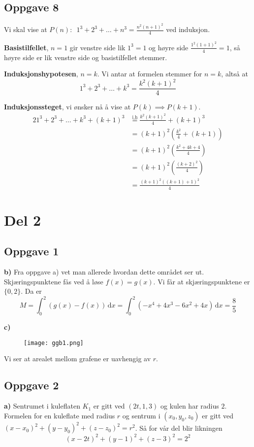 \subsection{Oppgave 8}
Vi skal vise at $P(n): \enspace1^3+2^3+\dots+n^3=\frac{n^2(n+1)^2}{4}$ ved induksjon. \newline

\textbf{Basistilfellet}, $n=1$ gir venstre side lik $1^3=1$ og høyre side $\frac{1^2(1+1)^2}{4}=1$, så høyre side er lik venstre side og basistilfellet stemmer. \newline

\textbf{Induksjonshypotesen}, $n=k$. Vi antar at formelen stemmer for $n=k$, altså at $$1^3+2^3+\dots+k^3 = \frac{k^2(k+1)^2}{4}$$ 

\textbf{Induksjonssteget}, vi ønsker nå å vise at $P(k)\implies P(k+1)$. 
\begin{alignat*}{2}
	1^3+2^3+\dots+k^3+(k+1)^3 &\overset{\text{i.h}}{=} \frac{k^2(k+1)^2}{4} + (k+1)^3 \\
	&= (k+1)^2\left(\frac{k^2}{4} + (k+1)\right) \\
	&= (k+1)^2 \left(\frac{k^2+4k+4}{4}\right) \\
	&= (k+1)^2 \left(\frac{(k+2)^2}{4}\right) \\
	&= \frac{(k+1)^2((k+1)+1)^2}{4}
\end{alignat*}
\newpage
\section{Del 2}
\subsection{Oppgave 1}
\textbf{b)} Fra oppgave a) vet man allerede hvordan dette området ser ut. Skjæringspunktene fås ved å løse $f(x)=g(x)$. Vi får at skjæringspunktene er $\{0,2\}$. Da er $$M=\int_0^2 (g(x)-f(x)) \, \text{d}x = \int_0^2 (-x^4+4x^3-6x^2+4x) \, \text{d}x = \frac85$$

\textbf{c)} 
\begin{figure}[ht]
	\centering
	\texttt{[image: ggb1.png]}
\end{figure}

Vi ser at arealet mellom grafene er uavhengig av $r$.

\subsection{Oppgave 2}
\textbf{a)} Sentrumet i kuleflaten $K_1$ er gitt ved $(2t,1,3)$ og kulen har radius $2$. Formelen for en kuleflate med radius $r$ og sentrum i $(x_0,y_0,z_0)$ er gitt ved $(x-x_0)^2+(y-y_0)^2+(z-z_0)^2=r^2$. Så for vår del blir likningen $$(x-2t)^2+(y-1)^2+(z-3)^2=2^2$$ 

